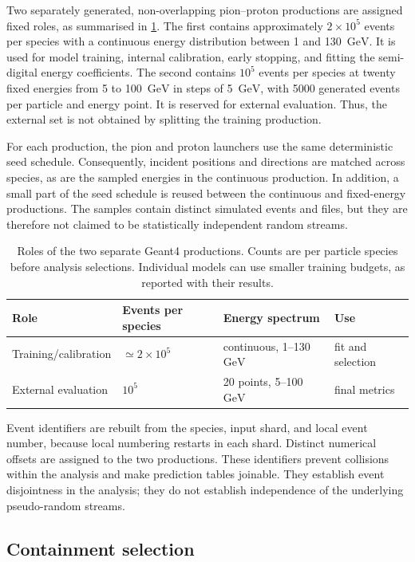 \documentclass[11pt,a4paper]{article}
\newcommand{\GeV}{\ensuremath{\mathrm{GeV}}}
\begin{document}
Two separately generated, non-overlapping pion--proton productions are assigned fixed roles, as
summarised in \cref{tab:samples}. The first contains approximately $2\times10^5$
events per species with a continuous energy distribution between 1 and 130~\GeV{}.
It is used for model training, internal calibration, early stopping, and fitting the
semi-digital energy coefficients. The second contains $10^5$ events per species at
twenty fixed energies from 5 to 100~\GeV{} in steps of 5~\GeV{}, with 5000 generated
events per particle and energy point. It is reserved for external evaluation. Thus,
the external set is not obtained by splitting the training production.

For each production, the pion and proton launchers use the same deterministic seed
schedule. Consequently, incident positions and directions are matched across species,
as are the sampled energies in the continuous production. In addition, a small part
of the seed schedule is reused between the continuous and fixed-energy productions.
The samples contain distinct simulated events and files, but they are therefore not
claimed to be statistically independent random streams.

\begin{table}[tb]
  \centering
  \caption{Roles of the two separate Geant4 productions. Counts are per particle
  species before analysis selections. Individual models can use smaller training
  budgets, as reported with their results.}
  \label{tab:samples}
  \begin{tabular}{llll}
    \toprule
    Role & Events per species & Energy spectrum & Use \\
    \midrule
    Training/calibration & $\simeq 2\times10^5$ & continuous, 1--130~\GeV & fit and selection \\
    External evaluation & $10^5$ & 20 points, 5--100~\GeV & final metrics \\
    \bottomrule
  \end{tabular}
\end{table}

Event identifiers are rebuilt from the species, input shard, and local event number,
because local numbering restarts in each shard. Distinct numerical offsets are assigned
to the two productions. These identifiers prevent collisions within the analysis and
make prediction tables joinable. They establish event disjointness in the analysis;
they do not establish independence of the underlying pseudo-random streams.

\subsection{Containment selection}
\label{sec:containment}
\end{document}
